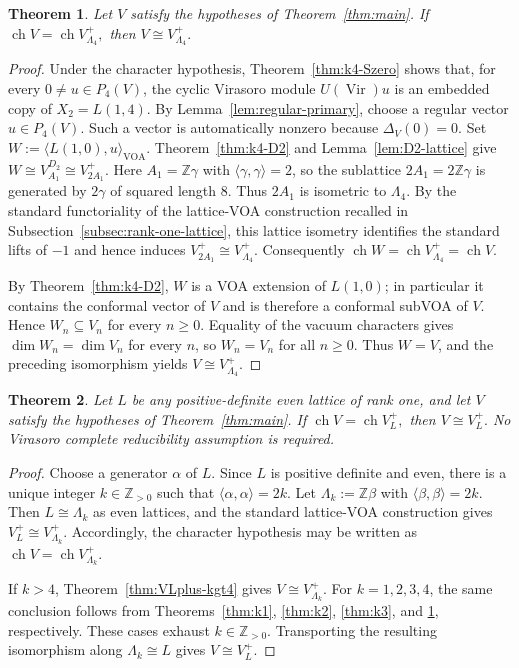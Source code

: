 \documentclass[12pt,leqno]{amsart}
\numberwithin{equation}{section} \newtheorem{thm}{Theorem}[section] \newtheorem{lem}[thm]{Lemma} \newtheorem{ex}[thm]{Example} \newtheorem{prop}[thm]{Proposition} \newtheorem{cor}[thm]{Corollary} \newtheorem{defi}[thm]{Definition} \newtheorem{rmk}[thm]{Remark} \newtheorem{notation}[thm]{Notation}
\newcommand{\Vir}{\operatorname{Vir}}
\newcommand{\ch}{\operatorname{ch}}
\def\Z{\mathbb{Z}} \def\N{\mathbb{N}} \def\A{\mathbb{A}} \def\C{\mathbb{C}} \def\R{\mathbb{R}} \def\Q{\mathbb{Q}} \def\F{\mathbb{F}}
\begin{document}
\begin{thm}\label{thm:k4}
Let $V$ satisfy the hypotheses of Theorem~\ref{thm:main}. If \(\ch V=\ch V_{\Lambda_4}^+,\) then \(V\cong V_{\Lambda_4}^+.\)
\end{thm}

\begin{proof}
Under the character hypothesis, Theorem~\ref{thm:k4-Szero} shows that, for every $0\ne u\in P_4(V)$, the cyclic Virasoro module $U(\Vir)u$ is an embedded copy of $X_2=L(1,4)$. By Lemma~\ref{lem:regular-primary}, choose a regular vector $u\in P_4(V)$. Such a vector is automatically nonzero because $\Delta_V(0)=0$. Set \(W:=\langle L(1,0),u\rangle_{\mathrm{VOA}}.\) Theorem~\ref{thm:k4-D2} and Lemma~\ref{lem:D2-lattice} give \(W\cong V_{A_1}^{D_2}\cong V_{2A_1}^+.\) Here $A_1=\Z\gamma$ with $\langle\gamma,\gamma\rangle=2$, so the sublattice $2A_1=2\Z\gamma$ is generated by $2\gamma$ of squared length $8$. Thus $2A_1$ is isometric to $\Lambda_4$. By the standard functoriality of the lattice-VOA construction recalled in Subsection~\ref{subsec:rank-one-lattice}, this lattice isometry identifies the standard lifts of $-1$ and hence induces \(V_{2A_1}^+\cong V_{\Lambda_4}^+.\) Consequently \(\ch W=\ch V_{\Lambda_4}^+=\ch V.\)

By Theorem~\ref{thm:k4-D2}, $W$ is a VOA extension of $L(1,0)$; in particular it contains the conformal vector of $V$ and is therefore a conformal subVOA of $V$. Hence $W_n\subseteq V_n$ for every $n\ge0$. Equality of the vacuum characters gives \(\dim W_n=\dim V_n\) for every $n$, so $W_n=V_n$ for all $n\ge0$. Thus $W=V$, and the preceding isomorphism yields \(V\cong V_{\Lambda_4}^+.\)
\end{proof}

\begin{thm}\label{thm:VLplus-all}
Let $L$ be any positive-definite even lattice of rank one, and let $V$ satisfy the hypotheses of Theorem~\ref{thm:main}. If \(\ch V=\ch V_L^+,\) then \(V\cong V_L^+.\) No Virasoro complete reducibility assumption is required.
\end{thm}

\begin{proof}
Choose a generator $\alpha$ of $L$. Since $L$ is positive definite and even, there is a unique integer $k\in\Z_{>0}$ such that \(\langle\alpha,\alpha\rangle=2k.\) Let $\Lambda_k:=\Z\beta$ with \(\langle\beta,\beta\rangle=2k.\) Then $L\cong\Lambda_k$ as even lattices, and the standard lattice-VOA construction gives \(V_L^+\cong V_{\Lambda_k}^+.\) Accordingly, the character hypothesis may be written as \(\ch V=\ch V_{\Lambda_k}^+.\)

If $k>4$, Theorem~\ref{thm:VLplus-kgt4} gives \(V\cong V_{\Lambda_k}^+.\) For $k=1,2,3,4$, the same conclusion follows from Theorems~\ref{thm:k1}, \ref{thm:k2}, \ref{thm:k3}, and \ref{thm:k4}, respectively. These cases exhaust $k\in\Z_{>0}$. Transporting the resulting isomorphism along $\Lambda_k\cong L$ gives \(V\cong V_L^+.\)
\end{proof}
\end{document}
